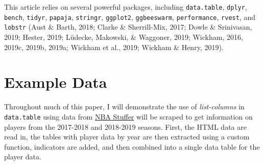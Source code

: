 \documentclass[doc,floatsintext]{apa6}
\begin{document}
This article relies on several powerful packages, including \texttt{data.table}, \texttt{dplyr}, \texttt{bench}, \texttt{tidyr}, \texttt{papaja}, \texttt{stringr}, \texttt{ggplot2}, \texttt{ggbeeswarm}, \texttt{performance}, \texttt{rvest}, and \texttt{lobstr} (Aust \& Barth, 2018; Clarke \& Sherrill-Mix, 2017; Dowle \& Srinivasan, 2019; Hester, 2019; Lüdecke, Makowski, \& Waggoner, 2019; Wickham, 2016, 2019c, 2019b, 2019a; Wickham et al., 2019; Wickham \& Henry, 2019).

\hypertarget{example-data}{%
\section{Example Data}\label{example-data}}

Throughout much of this paper, I will demonstrate the use of \emph{list-columns} in \texttt{data.table} using data from \href{nbastuffer.com}{NBA Stuffer} will be scraped to get information on players from the 2017-2018 and 2018-2019 seasons. First, the HTML data are read in, the tables with player data by year are then extracted using a custom function, indicators are added, and then combined into a single data table for the player data.
\end{document}
